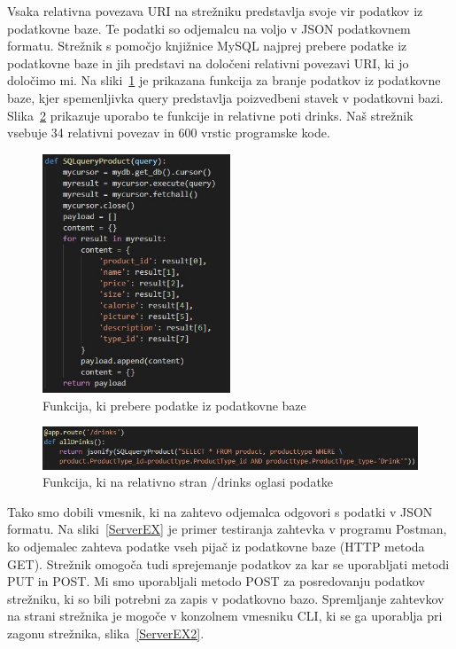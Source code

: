 \documentclass[a4paper, 12pt]{book}
\begin{document}
Vsaka relativna povezava URI na strežniku predstavlja svoje vir podatkov iz podatkovne baze. Te podatki so odjemalcu na voljo v JSON podatkovnem formatu. Strežnik s pomočjo knjižnice MySQL najprej prebere podatke iz podatkovne baze in jih predstavi na določeni relativni povezavi URI, ki jo določimo mi. Na sliki~\ref{Drinks_DB_function} je prikazana funkcija za branje podatkov iz podatkovne baze, kjer spemenljivka query predstavlja poizvedbeni stavek v podatkovni bazi. Slika~\ref{Drinks_URI} prikazuje uporabo te funkcije in relativne poti drinks. Naš strežnik vsebuje 34 relativni povezav in 600 vrstic programske kode.


\begin{figure}[!htb]
\begin{center}
\includegraphics[width=0.5\textwidth]{drinks_1.jpg}
\end{center}
\caption{Funkcija, ki prebere podatke iz podatkovne baze}
\label{Drinks_DB_function}
\end{figure}

\begin{figure}[!htb]
\begin{center}
\includegraphics[width=14cm]{drinks_2.jpg}
\end{center}
\caption{Funkcija, ki na relativno stran /drinks oglasi podatke}
\label{Drinks_URI}
\end{figure}

Tako smo dobili vmesnik, ki na zahtevo odjemalca odgovori s podatki v JSON formatu. Na sliki~\ref{ServerEX} je primer testiranja zahtevka v programu Postman, ko odjemalec zahteva podatke vseh pijač iz podatkovne baze (HTTP metoda GET). Strežnik omogoča tudi sprejemanje podatkov za kar se uporabljati metodi PUT in POST. Mi smo uporabljali metodo POST za posredovanju podatkov strežniku, ki so bili potrebni za zapis v podatkovno bazo. Spremljanje zahtevkov na strani strežnika je mogoče v konzolnem vmesniku CLI, ki se ga uporablja pri zagonu strežnika, slika~\ref{ServerEX2}.
\end{document}
